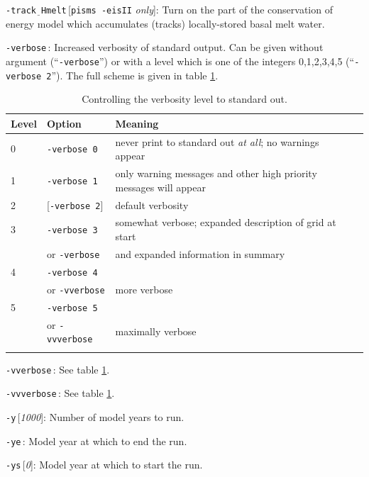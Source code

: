 \documentclass[11pt,final]{amsart}
\renewcommand{\t}[1]{\texttt{#1}}
\newcommand{\rawopt}[1]{\vspace{1mm}\noindent \large\texttt{-#1}\normalsize}
\newcommand{\opt}[1]{\rawopt{#1}\,:\quad}
\newcommand{\optdef}[2]{\rawopt{#1}\,[\textsl{#2}]:\quad}
\newcommand{\optrestrict}[2]{\rawopt{#1}\,[\texttt{#2} \textsl{only}]:\quad}
\newcommand{\und}{$\underline{\,\,\,}$}
\begin{document}
\optrestrict{track\und Hmelt}{pisms -eisII}    Turn on the part of the conservation of energy model which accumulates (tracks) locally-stored basal melt water.

\opt{verbose}   Increased verbosity of standard output.  Can be given without argument (``\verb|-verbose|'') or with a level which is one of the integers 0,1,2,3,4,5 (``\verb|-verbose 2|'').  The full scheme is given in table \ref{tab:verbosity}.

\begin{table}[h]
\caption{Controlling the verbosity level to standard out.}\label{tab:verbosity}
\begin{tabular}{@{}llll}\hline
\textbf{Level} & \textbf{Option} & \textbf{Meaning} \\ \hline
   0  &  \t{-verbose 0} &   never print to standard out \emph{at all}; no warnings appear  \\
   1  &  \t{-verbose 1} &   only warning messages and other high priority messages will appear  \\
   2  &  [\t{-verbose 2}] & default verbosity    \\
   3  &  \t{-verbose 3} &   somewhat verbose; expanded description of grid at start  \\
      &  or \quad \t{-verbose} &  and expanded information in summary    \\
   4  &  \t{-verbose 4} &     \\
      &  or \quad \t{-vverbose} &  more verbose    \\
   5  &  \t{-verbose 5} &     \\
      &  or \quad \t{-vvverbose} &  maximally verbose \\
\hline
\normalsize
\end{tabular}
\end{table}

\opt{vverbose}   See table \ref{tab:verbosity}.

\opt{vvverbose}   See table \ref{tab:verbosity}.

\optdef{y}{1000} Number of model years to run.

\opt{ye} Model year at which to end the run.

\optdef{ys}{0} Model year at which to start the run.
\end{document}
